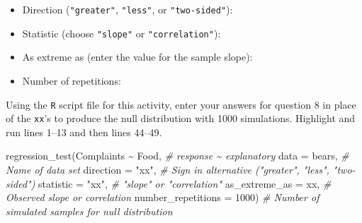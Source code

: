 \documentclass[
]{report}
\newenvironment{Shaded}{\begin{snugshade}}{\end{snugshade}}
\newcommand{\AttributeTok}[1]{\textcolor[rgb]{0.77,0.63,0.00}{#1}}
\newcommand{\CommentTok}[1]{\textcolor[rgb]{0.56,0.35,0.01}{\textit{#1}}}
\newcommand{\DecValTok}[1]{\textcolor[rgb]{0.00,0.00,0.81}{#1}}
\newcommand{\FunctionTok}[1]{\textcolor[rgb]{0.00,0.00,0.00}{#1}}
\newcommand{\NormalTok}[1]{#1}
\newcommand{\SpecialCharTok}[1]{\textcolor[rgb]{0.00,0.00,0.00}{#1}}
\newcommand{\StringTok}[1]{\textcolor[rgb]{0.31,0.60,0.02}{#1}}
\providecommand{\tightlist}{%
  \setlength{\itemsep}{0pt}\setlength{\parskip}{0pt}}
\begin{document}
\vspace{.5 mm}

\begin{itemize}
\tightlist
\item
  Direction (\texttt{"greater"}, \texttt{"less"}, or \texttt{"two-sided"}):
\end{itemize}

\vspace{.2in}

\begin{itemize}
\tightlist
\item
  Statistic (choose \texttt{"slope"} or \texttt{"correlation"}):
\end{itemize}

\vspace{.2in}

\begin{itemize}
\tightlist
\item
  As extreme as (enter the value for the sample slope):
\end{itemize}

\vspace{0.2in}

\begin{itemize}
\tightlist
\item
  Number of repetitions:
\end{itemize}

\vspace{.2in}

Using the \texttt{R} script file for this activity, enter your answers for question 8 in place of the \texttt{xx}'s to produce the null distribution with 1000 simulations. Highlight and run lines 1--13 and then lines 44--49.

\begin{Shaded}
\begin{Highlighting}[]
\FunctionTok{regression\_test}\NormalTok{(Complaints }\SpecialCharTok{\textasciitilde{}}\NormalTok{ Food, }\CommentTok{\# response \textasciitilde{} explanatory}
               \AttributeTok{data =}\NormalTok{ bears, }\CommentTok{\# Name of data set}
               \AttributeTok{direction =} \StringTok{"xx"}\NormalTok{, }\CommentTok{\# Sign in alternative ("greater", "less", "two{-}sided")}
               \AttributeTok{statistic =} \StringTok{"xx"}\NormalTok{, }\CommentTok{\# "slope" or "correlation"}
               \AttributeTok{as\_extreme\_as =}\NormalTok{ xx, }\CommentTok{\# Observed slope or correlation}
               \AttributeTok{number\_repetitions =} \DecValTok{1000}\NormalTok{) }\CommentTok{\# Number of simulated samples for null distribution}
       
\end{Highlighting}
\end{Shaded}
\end{document}

